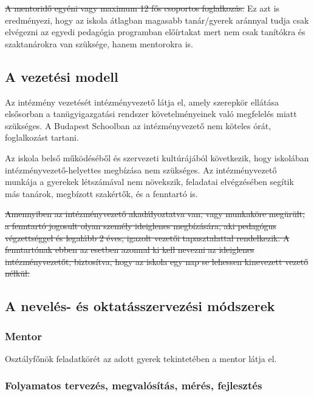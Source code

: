 \documentclass{article}
\providecommand{\DIFdeltex}[1]{{\protect\color{red}\sout{#1}}}                      %
\providecommand{\DIFdelbegin}{} %
\providecommand{\DIFdelend}{} %
\providecommand{\DIFdel}[1]{\texorpdfstring{\DIFdeltex{#1}}{}} %
\newcommand{\DIFscaledelfig}{0.5}
\newlength{\DIFdelgraphicswidth} %
\newlength{\DIFdelgraphicsheight} %
\newcommand{\DIFdelincludegraphics}[2][]{%
\sbox{\DIFdelgraphicsbox}{\DIFOincludegraphics[#1]{#2}}%
\settoboxwidth{\DIFdelgraphicswidth}{\DIFdelgraphicsbox} %
\settoboxtotalheight{\DIFdelgraphicsheight}{\DIFdelgraphicsbox} %
\scalebox{\DIFscaledelfig}{%
\parbox[b]{\DIFdelgraphicswidth}{\usebox{\DIFdelgraphicsbox}\\[-\baselineskip] \rule{\DIFdelgraphicswidth}{0em}}\llap{\resizebox{\DIFdelgraphicswidth}{\DIFdelgraphicsheight}{%
\setlength{\unitlength}{\DIFdelgraphicswidth}%
\begin{picture}(1,1)%
\thicklines\linethickness{2pt} %
{\color[rgb]{1,0,0}\put(0,0){\framebox(1,1){}}}%
{\color[rgb]{1,0,0}\put(0,0){\line( 1,1){1}}}%
{\color[rgb]{1,0,0}\put(0,1){\line(1,-1){1}}}%
\end{picture}%
}\hspace*{3pt}}} %
} %
\DeclareRobustCommand{\DIFdelbegin}{\DIFOdelbegin \let\includegraphics\DIFdelincludegraphics} %
\DeclareRobustCommand{\DIFdelend}{\DIFOaddend \let\includegraphics\DIFOincludegraphics} %
\begin{document}
\DIFdelbegin \DIFdel{A mentoridő egyéni vagy maximum 12 fős csoportos foglalkozás. }\DIFdelend Ez azt is eredményezi, hogy az iskola átlagban magasabb tanár/gyerek
aránnyal tudja csak elvégezni az egyedi pedagógia programban előírtakat
mert nem csak tanítókra és szaktanárokra van szüksége, hanem mentorokra
is.

\hypertarget{a-vezetesi-modell}{%
\subsection{A vezetési modell}\label{a-vezetesi-modell}}

Az intézmény vezetését intézményvezető látja el, amely szerepkör
ellátása elsősorban a tanügyigazgatási rendszer követelményeinek való
megfelelés miatt szükséges. A Budapest Schoolban az intézményvezető nem
köteles órát, foglalkozást tartani.

Az iskola belső működéséből és szervezeti kultúrájából következik, hogy
iskolában intézményvezető-helyettes megbízása nem szükséges. Az
intézményvezető munkája a gyerekek létszámával nem növekszik, feladatai
elvégzésében segítik más tanárok, megbízott szakértők, és a fenntartó
is.

\DIFdelbegin \DIFdel{Amennyiben az intézményvezető akadályoztatva van, vagy munkaköre
megürült, a fenntartó jogosult olyan személy ideiglenes megbízására, aki
pedagógus végzettséggel és legalább 2 éves, igazolt vezetői
tapasztalattal rendelkezik. A fenntartónak ebben az esetben azonnal ki
kell nevezni az ideiglenes intézményvezetőt, biztosítva, hogy az iskola
egy nap se lehessen kinevezett vezető nélkül.
}%

\DIFdelend \hypertarget{a-neveles--es-oktatasszervezesi-modszerek}{%
\subsection{A nevelés- és oktatásszervezési
módszerek}\label{a-neveles--es-oktatasszervezesi-modszerek}}

\hypertarget{mentor}{%
\subsubsection{Mentor}\label{mentor}}

Osztályfőnök feladatkörét az adott gyerek tekintetében a mentor látja
el.

\hypertarget{folyamatos-tervezes-megvalositas-meres-fejlesztes}{%
\subsubsection{Folyamatos tervezés, megvalósítás, mérés,
fejlesztés}\label{folyamatos-tervezes-megvalositas-meres-fejlesztes}}
\end{document}
